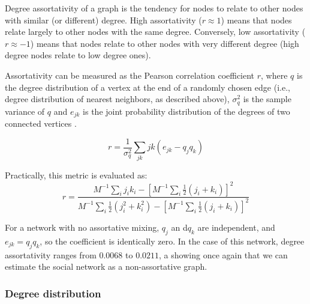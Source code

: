 \documentclass[12pt]{article}
\begin{document}
Degree assortativity of a graph is the tendency for nodes to relate to other nodes with similar (or different) degree. High assortativity (\(r \approx 1\)) means that nodes relate largely to other nodes with the same degree. Conversely, low assortativity (\(r \approx -1\)) means that nodes relate to other nodes with very different degree (high degree nodes relate to low degree ones). 

Assortativity can be measured as the Pearson correlation coefficient \(r\), where \(q\) is the degree distribution of a vertex at the end of a randomly chosen edge (i.e., degree distribution of nearest neighbors, as described above), \(\sigma^2_q\) is the sample variance of \(q\) and \(e_{jk}\) is the joint probability distribution of the degrees of two connected vertices \cite{2}.

\begin{equation}
r = \frac{1}{\sigma^2_q} \sum_{jk} jk(e_{jk} - q_{j}q_{k})
\label{eq:rk}
\end{equation}

 Practically, this metric is evaluated as:
\begin{equation}
r = \frac{M^{-1} \sum_i j_i k_i - [M^{-1} \sum_i \frac{1}{2} (j_i + k_i)]^2}{M^{-1} \sum_i\frac{1}{2} (j_i^2 + k_i^2) - [M^{-1} \sum_i \frac{1}{2} (j_i + k_i)]^2}
\end{equation}

For a network with no assortative mixing, \(q_j\) an d\(q_k\) are independent, and \(e_{jk} = q_{j}q_{k}\), so the coefficient is identically zero. In the case of this network, degree assortativity ranges from \( 0.0068 \) to \(0.0211\), a showing once again that we can estimate the social network as a non-assortative graph.

\subsubsection*{Degree distribution}
\end{document}
